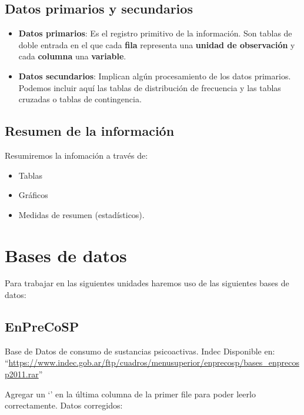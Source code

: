 \documentclass[spanish,]{book}
\providecommand{\tightlist}{%
  \setlength{\itemsep}{0pt}\setlength{\parskip}{0pt}}
\begin{document}
\section{Datos primarios y
secundarios}\label{datos-primarios-y-secundarios}

\begin{itemize}
\item
  \textbf{Datos primarios}: Es el registro primitivo de la información.
  Son tablas de doble entrada en el que cada \textbf{fila} representa
  una \textbf{unidad de observación} y cada \textbf{columna} una
  \textbf{variable}.
\item
  \textbf{Datos secundarios}: Implican algún procesamiento de los datos
  primarios. Podemos incluir aquí las tablas de distribución de
  frecuencia y las tablas cruzadas o tablas de contingencia.
\end{itemize}

\section{Resumen de la información}\label{resumen-de-la-informacion}

Resumiremos la infomación a través de:

\begin{itemize}
\tightlist
\item
  Tablas
\item
  Gráficos
\item
  Medidas de resumen (estadísticos).
\end{itemize}

\chapter{Bases de datos}\label{bases-de-datos}

Para trabajar en las siguientes unidades haremos uso de las siguientes
bases de datos:

\section{EnPreCoSP}\label{enprecosp}

Base de Datos de consumo de sustancias psicoactivas. Indec Disponible
en:
``\url{https://www.indec.gob.ar/ftp/cuadros/menusuperior/enprecosp/bases_enprecosp2011.rar}''

Agregar un `\textbar{}' en la última columna de la primer file para
poder leerlo correctamente. Datos corregidos:
\end{document}
